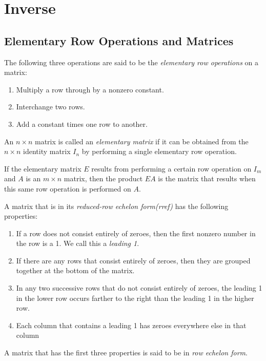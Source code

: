\documentclass{report}
\begin{document}
	\section{Inverse}
		\subsection{Elementary Row Operations and Matrices}
		
		\begin{defn}\label{def_elementary_row_operations}
			The following three operations are said to be the \emph{elementary row operations} on a matrix:
			\begin{enumerate}
				\item Multiply a row through by a nonzero constant.
				\item Interchange two rows.
				\item Add a constant times one row to another.
			\end{enumerate}
		\end{defn}
		
		\begin{defn}
			An $n \times n$ matrix is called an \emph{elementary matrix} if it can be obtained from the $n \times n$ identity matrix $I_n$ by performing a single elementary row operation.
		\end{defn}
		
		\begin{thm}
			If the elementary matrix $E$ results from performing a certain row operation on $I_m$ and $A$ is an $m \times n$ matrix, then the product $EA$ is the matrix that results when this same row operation is performed on $A$.
		\end{thm}
		
		\begin{defn}
			A matrix that is in its \emph{reduced-row echelon form(rref)} has the following properties:
			\begin{enumerate}
				\item If a row does not consist entirely of zeroes, then the first nonzero number in the row is a 1. We call this a \emph{leading 1}.
				\item If there are any rows that consist entirely of zeroes, then they are grouped together at the bottom of the matrix.
				\item In any two successive rows that do not consist entirely of zeroes, the leading 1 in the lower row occurs farther to the right than the leading 1 in the higher row.
				\item Each column that contains a leading 1 has zeroes everywhere else in that column
			\end{enumerate}
			A matrix that has the first three properties is said to be in \emph{row echelon form}.
		\end{defn}
		
\end{document}

